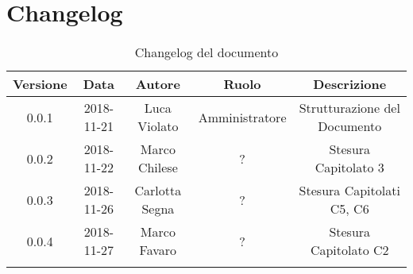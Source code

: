 \section{Changelog}

\begin{center}
\begin{longtable}{|c|c|c|c|c|}
\hline
\textbf{Versione} & \textbf{Data} & \textbf{Autore} & \textbf{Ruolo} & \textbf{Descrizione} \\
\hline \hline
\endfirsthead
0.0.1 & 2018-11-21 & Luca Violato & Amministratore & Strutturazione del Documento \\
0.0.2 & 2018-11-22 & Marco Chilese & ? & Stesura Capitolato 3 \\
0.0.3 & 2018-11-26 & Carlotta Segna & ? & Stesura Capitolati C5, C6 \\
0.0.4 & 2018-11-27 & Marco Favaro & ? & Stesura Capitolato C2 \\
\hline
\caption{Changelog del documento}
\end{longtable}
\end{center}
